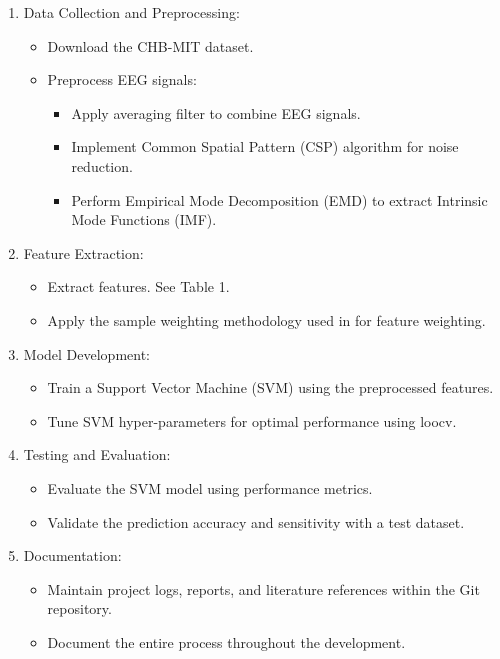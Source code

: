 \documentclass[12pt]{article}
\begin{document}
\begin{enumerate}
    \item Data Collection and Preprocessing:
    \begin{itemize}
        \item Download the CHB-MIT dataset.
        \item Preprocess EEG signals:
        \begin{itemize}
            \item Apply averaging filter to combine EEG signals.
            \item Implement Common Spatial Pattern (CSP) algorithm for noise reduction.
            \item Perform Empirical Mode Decomposition (EMD) to extract Intrinsic Mode Functions (IMF).
        \end{itemize}
    \end{itemize}
    
    \item Feature Extraction:
    \begin{itemize}
        \item Extract features. See Table 1.
        \item Apply the sample weighting methodology used in \cite{gao2022general} for feature weighting.
    \end{itemize}
    
    \item Model Development:
    \begin{itemize}
        \item Train a Support Vector Machine (SVM) using the preprocessed features.
        \item Tune SVM hyper-parameters for optimal performance using \acrshort{loocv}.
    \end{itemize}
    
    \item Testing and Evaluation:
    \begin{itemize}
        \item Evaluate the SVM model using performance metrics.
        \item Validate the prediction accuracy and sensitivity with a test dataset.
    \end{itemize}
    
    \item Documentation:
    \begin{itemize}
        \item Maintain project logs, reports, and literature references within the Git repository.
        \item Document the entire process throughout the development.
    \end{itemize}
    

\end{enumerate}
\end{document}
